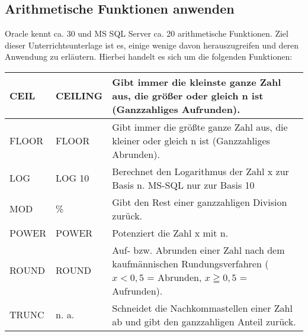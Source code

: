       \subsection{Arithmetische Funktionen anwenden}
        Oracle kennt ca. 30 und MS SQL Server ca. 20 arithmetische Funktionen.
        Ziel dieser Unterrichtsunterlage ist es, einige wenige davon
        herauszugreifen und deren Anwendung zu erläutern. Hierbei handelt es
        sich um die folgenden Funktionen:
\clearpage
        \begin{center}
          \label{srfarithmfct}
          \begin{small}
            \tabletail{
              \hline
            }
            \tablelasttail {
              \hline
            }
            \begin{supertabular}{|l|l|p{10cm}|}
              CEIL & CEILING & Gibt immer die kleinste ganze Zahl aus, die
              größer oder gleich n ist (Ganzzahliges Aufrunden).\\
              \hline
              FLOOR & FLOOR & Gibt immer die größte ganze Zahl aus, die
              kleiner oder gleich n ist (Ganzzahliges Abrunden). \\
              \hline
              LOG & LOG 10 & Berechnet den Logarithmus der Zahl x zur Basis n. MS-SQL nur zur Basis 10 \\
              \hline
              MOD & \% & Gibt den Rest einer ganzzahligen Division zurück. \\
              \hline
              POWER & POWER & Potenziert die Zahl x mit n. \\
              \hline
              ROUND & ROUND & Auf- bzw. Abrunden einer Zahl nach dem
              kaufmännischen Rundungsverfahren ($x < 0,5$ = Abrunden, $x \geqq
              0,5$ = Aufrunden). \\
              \hline
              TRUNC & n. a. & Schneidet die Nachkommastellen einer Zahl ab und
              gibt den ganzzahligen Anteil zurück. \\
            \end{supertabular}
          \end{small}
        \end{center}
